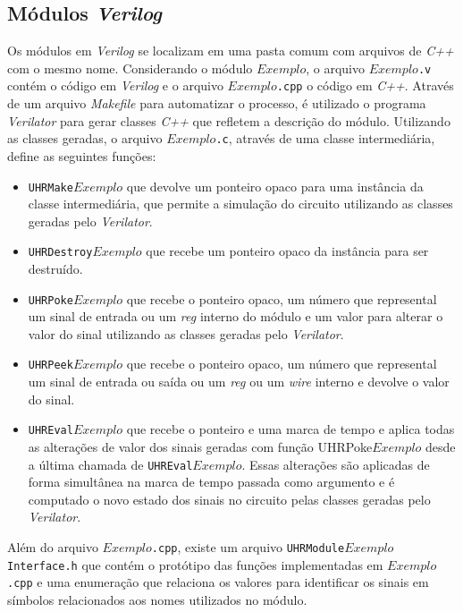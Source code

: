 \subsection{Módulos \emph{Verilog}}
\label{ssec:mverilog}

Os módulos em \emph{Verilog} se localizam em uma pasta comum com arquivos de \emph{C++} com o mesmo nome.
Considerando o módulo $Exemplo$, o arquivo \texttt{$Exemplo$.v} contém o código em \emph{Verilog} e o
arquivo \texttt{$Exemplo$.cpp} o código em \emph{C++}. Através de um arquivo \emph{Makefile} \citep{make} 
para automatizar o processo, é utilizado o programa \emph{Verilator} para gerar classes \emph{C++} que 
refletem a descrição do módulo. Utilizando as classes geradas, o arquivo \texttt{$Exemplo$.c}, através de uma
classe intermediária, define as seguintes funções:

\begin{itemize}
  \item \texttt{UHRMake$Exemplo$} que devolve um ponteiro opaco para uma instância da classe intermediária, que permite a simulação
        do circuito utilizando as classes geradas pelo \emph{Verilator}.
  \item \texttt{UHRDestroy$Exemplo$} que recebe um ponteiro opaco da instância para ser destruído.
  \item \texttt{UHRPoke$Exemplo$} que recebe o ponteiro opaco, um número que represental um sinal de entrada ou um \emph{reg} interno do módulo e um valor para
        alterar o valor do sinal utilizando as classes geradas pelo \emph{Verilator}.
  \item \texttt{UHRPeek$Exemplo$} que recebe o ponteiro opaco, um número que represental um sinal de entrada ou saída ou um \emph{reg} ou um \emph{wire} interno e 
        devolve o valor do sinal.
  \item \texttt{UHREval$Exemplo$} que recebe o ponteiro e uma marca de tempo e aplica todas as alterações de valor dos sinais geradas com função UHRPoke$Exemplo$ desde a última chamada
        de \texttt{UHREval$Exemplo$}. Essas alterações são aplicadas de forma simultânea na marca de tempo passada como argumento e é computado o novo estado dos 
        sinais no circuito pelas classes geradas pelo \emph{Verilator}.
\end{itemize}

Além do arquivo \texttt{$Exemplo$.cpp}, existe um arquivo \texttt{UHRModule$Exemplo$Interface.h} que contém o protótipo das funções
implementadas em \texttt{$Exemplo$.cpp} e uma enumeração que relaciona os valores para identificar os sinais em símbolos relacionados 
aos nomes utilizados no módulo.

